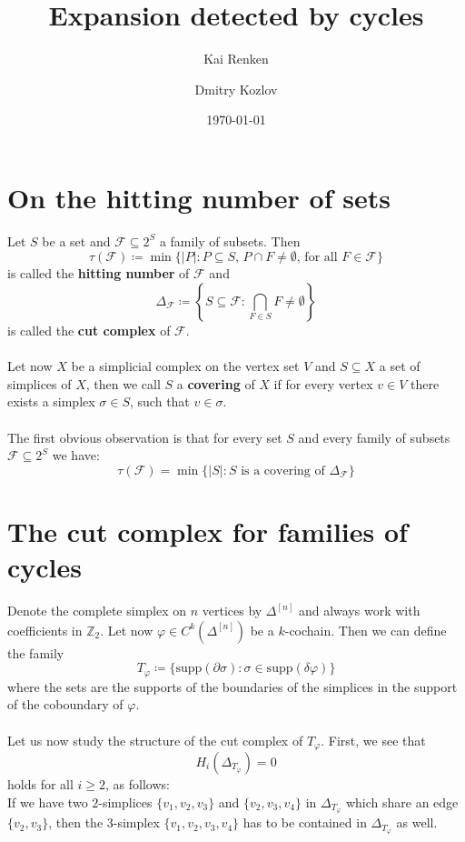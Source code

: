 \documentclass{article}
\title{Expansion detected by cycles}
\author{Kai Renken \and Dmitry Kozlov}
\date{\today}
\newcommand{\supp}{\mathrm{supp}}
\newcommand{\Z}{\mathbb{Z}}
\begin{document}
\maketitle


\begin{abstract}

\end{abstract}

\section{On the hitting number of sets}

Let $S$ be a set and $\mathcal{F}\subseteq 2^S$ a family of subsets. Then
\[
\tau(\mathcal{F})\coloneqq\min\{|P|:P\subseteq S\text{, }P\cap F\neq\emptyset\text{, for all }F\in\mathcal{F}\}
\]
is called the \textbf{hitting number} of $\mathcal{F}$ and
\[
\Delta_{\mathcal{F}}\coloneqq\left\{S\subseteq\mathcal{F}:\bigcap\limits_{F\in S}F\neq\emptyset\right\}
\]
is called the \textbf{cut complex} of $\mathcal{F}$.\\
\\
Let now $X$ be a simplicial complex on the vertex set $V$ and $S\subseteq X$ a set of simplices of $X$, then we call $S$ a \textbf{covering} of $X$ if for every vertex $v\in V$ there exists a simplex $\sigma\in S$, such that $v\in\sigma$.\\
\\
The first obvious observation is that for every set $S$ and every family of subsets $\mathcal{F}\subseteq 2^S$ we have:
\[
\tau(\mathcal{F})=\min\{|S|:S\text{ is a covering of }\Delta_{\mathcal{F}}\}
\]

\section{The cut complex for families of cycles}

Denote the complete simplex on $n$ vertices by $\Delta^{[n]}$ and always work with coefficients in $\Z_2$. Let now $\varphi\in C^k(\Delta^{[n]})$ be a $k$-cochain. Then we can define the family
\[
T_{\varphi}\coloneqq\{\supp(\partial\sigma):\sigma\in\supp(\delta\varphi)\}
\]
where the sets are the supports of the boundaries of the simplices in the support of the coboundary of $\varphi$.\\
\\
Let us now study the structure of the cut complex of $T_{\varphi}$. First, we see that
\[
H_i(\Delta_{T_{\varphi}})=0
\]
holds for all $i\geq 2$, as follows:\\
If we have two $2$-simplices $\{v_1,v_2,v_3\}$ and $\{v_2,v_3,v_4\}$ in $\Delta_{T_{\varphi}}$ which share an edge $\{v_2,v_3\}$, then the $3$-simplex $\{v_1,v_2,v_3,v_4\}$ has to be contained in $\Delta_{T_{\varphi}}$ as well.
\begin{thebibliography}{9}

\end{thebibliography}
\end{document}
